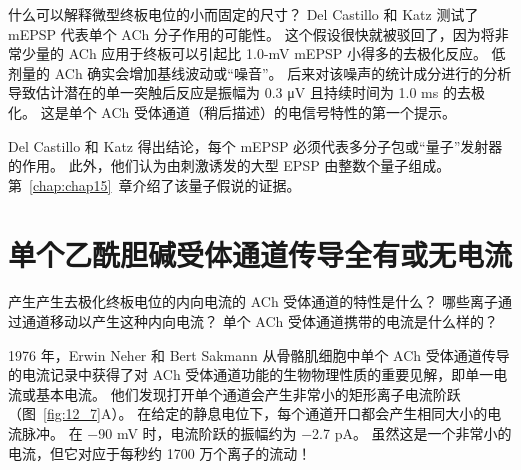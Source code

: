 什么可以解释微型终板电位的小而固定的尺寸？ 
Del Castillo 和 Katz 测试了 mEPSP 代表单个 ACh 分子作用的可能性。 
这个假设很快就被驳回了，因为将非常少量的 ACh 应用于终板可以引起比 1.0-mV mEPSP 小得多的去极化反应。 
低剂量的 ACh 确实会增加基线波动或“噪音”。 
后来对该噪声的统计成分进行的分析导致估计潜在的单一突触后反应是振幅为 0.3 μV 且持续时间为 1.0 ms 的去极化。 
这是单个 ACh 受体通道（稍后描述）的电信号特性的第一个提示。


Del Castillo 和 Katz 得出结论，每个 mEPSP 必须代表多分子包或“量子”发射器的作用。 
此外，他们认为由刺激诱发的大型 EPSP 由整数个量子组成。 
第~\ref{chap:chap15}~章介绍了该量子假说的证据。



\section{单个乙酰胆碱受体通道传导全有或无电流}

产生产生去极化终板电位的内向电流的 ACh 受体通道的特性是什么？
哪些离子通过通道移动以产生这种内向电流？
单个 ACh 受体通道携带的电流是什么样的？


1976 年，Erwin Neher 和 Bert Sakmann 从骨骼肌细胞中单个 ACh 受体通道传导的电流记录中获得了对 ACh 受体通道功能的生物物理性质的重要见解，即单一电流或基本电流。
他们发现打开单个通道会产生非常小的矩形离子电流阶跃（图~\ref{fig:12_7}A）。
在给定的静息电位下，每个通道开口都会产生相同大小的电流脉冲。
在 −90 mV 时，电流阶跃的振幅约为 −2.7 pA。 
虽然这是一个非常小的电流，但它对应于每秒约 1700 万个离子的流动！


